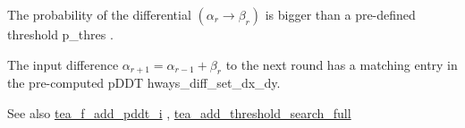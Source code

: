 \begin{DoxyEnumerate}
\item \-The probability of the differential $(\alpha_r \rightarrow \beta_r)$ is bigger than a pre-\/defined threshold {\ttfamily p\-\_\-thres} .
\item \-The input difference $\alpha_{r+1} = \alpha_{r-1} + \beta_{r}$ to the next round has a matching entry in the pre-\/computed p\-D\-D\-T {\ttfamily hways\-\_\-diff\-\_\-set\-\_\-dx\-\_\-dy}.
\end{DoxyEnumerate}

\begin{DoxySeeAlso}{\-See also}
\hyperlink{tea-f-add-pddt_8hh_ae8e09fe95cc3eb4257b868d91f8924ec}{tea\-\_\-f\-\_\-add\-\_\-pddt\-\_\-i} , \hyperlink{tea-add-threshold-search_8cc_a760f25356b1203a35c8ece3f4e8a038c}{tea\-\_\-add\-\_\-threshold\-\_\-search\-\_\-full} 
\end{DoxySeeAlso}
